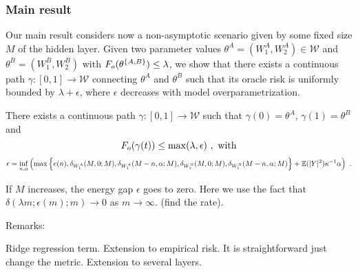 \subsubsection{Main result}

Our main result considers now a non-asymptotic scenario given by some fixed
size $M$ of the hidden layer. Given two parameter values $\theta^A = (W_1^A, W_2^A) \in \mathcal{W}$ 
and $\theta^B= (W_1^B, W_2^B)$ with $F_{o}(\theta^{\{A,B\} } ) \leq \lambda$, 
we show that there exists a continuous path 
$\gamma: [0,1] \to \mathcal{W}$ connecting $\theta^A$ and $\theta^B$ 
such that its oracle risk is uniformly bounded by $\lambda + \epsilon$, where $\epsilon$ 
decreases with model overparametrization. 
\begin{theorem}
There exists a continuous path $\gamma: [0,1] \to \mathcal{W}$ such that
$\gamma(0) = \theta^A$, $\gamma(1) = \theta^B$ and
\begin{equation}
F_{o}( \gamma(t) )  \leq \max( \lambda, \epsilon)~,\text{ with}
\end{equation}
\begin{equation}
\epsilon = \inf_{n, \alpha} \left(\max \left\{ e(n), \delta_{W_1^A}(M, 0; M ) , \delta_{W_1^A}(M-n, \alpha; M ) ,  \delta_{W_1^B}(M, 0; M ) , \delta_{W_1^B}(M-n, \alpha; M ) \right\} + {\mathbb{E}}(|Y|^2) \kappa^{-1} \alpha \right)~.
\end{equation}
\end{theorem}

\begin{corollary}
If $M$ increases, the energy gap $\epsilon$ goes to zero.
Here we use the fact that $\delta(\lambda m; \epsilon(m); m) \to 0$ as $m \to \infty$. (find the rate).
\end{corollary}

Remarks:

Ridge regression term.
Extension to empirical risk. It is straightforward just change the metric. 
Extension to several layers.


